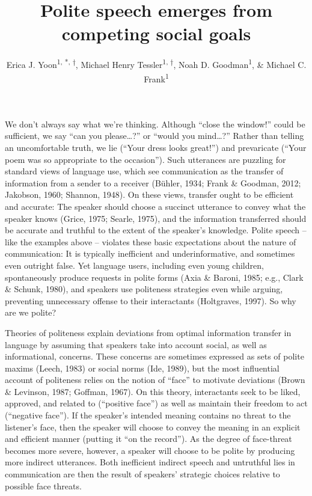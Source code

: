 \documentclass[floatsintext,man]{apa6}
\title{Polite speech emerges from competing social goals}
\author{Erica J. Yoon\textsuperscript{1, *, †}, Michael Henry Tessler\textsuperscript{1, †}, Noah D. Goodman\textsuperscript{1}, \& Michael C. Frank\textsuperscript{1}}
\affiliation{
    \vspace{0.5cm}
          \textsuperscript{1} Department of Psychology, Stanford University\\
          \textsuperscript{*} Corresponding author\\
          \textsuperscript{†} These authors contributed equally to this work.  }
\theoremstyle{definition}
\theoremstyle{definition}
\theoremstyle{definition}
\theoremstyle{remark}
\begin{document}
\maketitle

\setcounter{secnumdepth}{0}



 

\newcommand{\red}[1]{{\textcolor{Red}{#1}}}
\newcommand{\mht}[1]{{\textcolor{Blue}{[mht: #1]}}}







We don't always say what we're thinking. Although \enquote{close the
window!} could be sufficient, we say \enquote{can you please\ldots{}?}
or \enquote{would you mind\ldots{}?} Rather than telling an
uncomfortable truth, we lie (\enquote{Your dress looks great!}) and
prevaricate (\enquote{Your poem was so appropriate to the occasion}).
Such utterances are puzzling for standard views of language use, which
see communication as the transfer of information from a sender to a
receiver (Bühler, 1934; Frank \& Goodman, 2012; Jakobson, 1960; Shannon,
1948). On these views, transfer ought to be efficient and accurate: The
speaker should choose a succinct utterance to convey what the speaker
knows (Grice, 1975; Searle, 1975), and the information transferred
should be accurate and truthful to the extent of the speaker's
knowledge. Polite speech -- like the examples above -- violates these
basic expectations about the nature of communication: It is typically
inefficient and underinformative, and sometimes even outright false. Yet
language users, including even young children, spontaneously produce
requests in polite forms (Axia \& Baroni, 1985; e.g., Clark \& Schunk,
1980), and speakers use politeness strategies even while arguing,
preventing unnecessary offense to their interactants (Holtgraves, 1997).
So why are we polite?

Theories of politeness explain deviations from optimal information
transfer in language by assuming that speakers take into account social,
as well as informational, concerns. These concerns are sometimes
expressed as sets of polite maxims (Leech, 1983) or social norms (Ide,
1989), but the most influential account of politeness relies on the
notion of \enquote{face} to motivate deviations (Brown \& Levinson,
1987; Goffman, 1967). On this theory, interactants seek to be liked,
approved, and related to (\enquote{positive face}) as well as maintain
their freedom to act (\enquote{negative face}). If the speaker's
intended meaning contains no threat to the listener's face, then the
speaker will choose to convey the meaning in an explicit and efficient
manner (putting it \enquote{on the record}). As the degree of
face-threat becomes more severe, however, a speaker will choose to be
polite by producing more indirect utterances. Both inefficient indirect
speech and untruthful lies in communication are then the result of
speakers' strategic choices relative to possible face threats.
\end{document}
